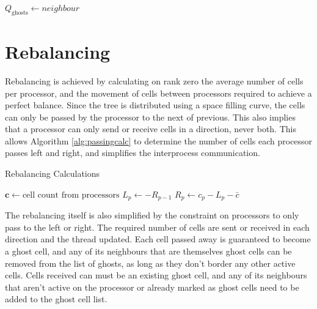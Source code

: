 \documentclass[12pt]{article}
\newcommand{\vect}[1]{\bm{#1}}
\begin{document}
\begin{algorithm}
\begin{algorithmic}
				\State $Q_\mathrm{ghosts} \gets neighbour$
			\Else
				\State {}
				\State {}
			\EndIf
		\EndIf
	\EndFor
\EndFunction
\end{algorithmic}
\end{algorithm}

\section{Rebalancing}

Rebalancing is achieved by calculating on rank zero the average number of cells per processor, and the movement of cells between processors required to achieve a perfect balance. Since the tree is distributed using a space filling curve, the cells can only be passed by the processor to the next of previous. This also implies that a processor can only send or receive cells in a direction, never both. This allows Algorithm \ref{alg:passingcalc} to determine the number of cells each processor passes left and right, and simplifies the interprocess communication.

\begin{algorithm}
\begin{algorithmic}
\caption{Rebalancing Calculations}
\label{alg:passingcalc}

	\State $\vect{c} \gets \text{cell count from processors}$
		\State $L_p \gets -R_{p-1}$
		\State $R_p \gets c_p - L_p - \bar{c}$
	\EndFor
\EndFunction

\end{algorithmic}
\end{algorithm}

The rebalancing itself is also simplified by the constraint on processors to only pass to the left or right. The required number of cells are sent or received in each direction and the thread updated. Each cell passed away is guaranteed to become a ghost cell, and any of its neighbours that are themselves ghost cells can be removed from the list of ghosts, as long as they don't border any other active cells. Cells received can must be an existing ghost cell, and any of its neighbours that aren't active on the processor or already marked as ghost cells need to be added to the ghost cell list.
\end{document}
